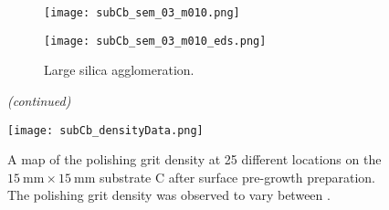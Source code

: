 \begin{figure}[htbp]
\ContinuedFloat
    \centering
    \begin{subfigure}[t]{\textwidth}
          \begin{minipage}[t]{0.49\linewidth}
            \centering
            \texttt{[image: subCb\_sem\_03\_m010.png]}
          \end{minipage}
          \hfill
          \begin{minipage}[t]{0.49\linewidth}
            \centering
            \texttt{[image: subCb\_sem\_03\_m010\_eds.png]}
          \end{minipage}
        \caption{Large silica agglomeration.}\label{fig:subCb_silica_large}
    \end{subfigure}
    \captionsetup{list=no}
    \caption{\emph{(continued)}}
\end{figure}


\begin{figure}[htbp]
    \centering
    \texttt{[image: subCb\_densityData.png]}
    \caption[Map of the polishing grit density on substrate C after surface pre-growth preparation.]{A map of the polishing grit density at 25 different locations on the $\SI{15}{\milli\metre}\times\SI{15}{\milli\metre}$ substrate C after surface pre-growth preparation. The polishing grit density was observed to vary between .}
    \label{fig:subCb_densityData}
\end{figure}


